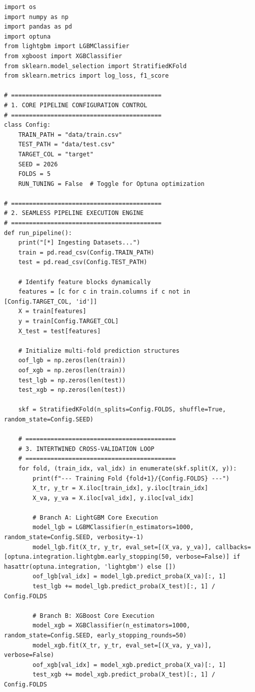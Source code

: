 \documentclass{article}
\begin{document}
\begin{verbatim}
import os
import numpy as np
import pandas as pd
import optuna
from lightgbm import LGBMClassifier
from xgboost import XGBClassifier
from sklearn.model_selection import StratifiedKFold
from sklearn.metrics import log_loss, f1_score

# ==========================================
# 1. CORE PIPELINE CONFIGURATION CONTROL
# ==========================================
class Config:
    TRAIN_PATH = "data/train.csv"
    TEST_PATH = "data/test.csv"
    TARGET_COL = "target"
    SEED = 2026
    FOLDS = 5
    RUN_TUNING = False  # Toggle for Optuna optimization

# ==========================================
# 2. SEAMLESS PIPELINE EXECUTION ENGINE
# ==========================================
def run_pipeline():
    print("[*] Ingesting Datasets...")
    train = pd.read_csv(Config.TRAIN_PATH)
    test = pd.read_csv(Config.TEST_PATH)

    # Identify feature blocks dynamically
    features = [c for c in train.columns if c not in [Config.TARGET_COL, 'id']]
    X = train[features]
    y = train[Config.TARGET_COL]
    X_test = test[features]

    # Initialize multi-fold prediction structures
    oof_lgb = np.zeros(len(train))
    oof_xgb = np.zeros(len(train))
    test_lgb = np.zeros(len(test))
    test_xgb = np.zeros(len(test))

    skf = StratifiedKFold(n_splits=Config.FOLDS, shuffle=True, random_state=Config.SEED)

    # ==========================================
    # 3. INTERTWINED CROSS-VALIDATION LOOP
    # ==========================================
    for fold, (train_idx, val_idx) in enumerate(skf.split(X, y)):
        print(f"--- Training Fold {fold+1}/{Config.FOLDS} ---")
        X_tr, y_tr = X.iloc[train_idx], y.iloc[train_idx]
        X_va, y_va = X.iloc[val_idx], y.iloc[val_idx]

        # Branch A: LightGBM Core Execution
        model_lgb = LGBMClassifier(n_estimators=1000, random_state=Config.SEED, verbosity=-1)
        model_lgb.fit(X_tr, y_tr, eval_set=[(X_va, y_va)], callbacks=[optuna.integration.lightgbm.early_stopping(50, verbose=False)] if hasattr(optuna.integration, 'lightgbm') else [])
        oof_lgb[val_idx] = model_lgb.predict_proba(X_va)[:, 1]
        test_lgb += model_lgb.predict_proba(X_test)[:, 1] / Config.FOLDS

        # Branch B: XGBoost Core Execution
        model_xgb = XGBClassifier(n_estimators=1000, random_state=Config.SEED, early_stopping_rounds=50)
        model_xgb.fit(X_tr, y_tr, eval_set=[(X_va, y_va)], verbose=False)
        oof_xgb[val_idx] = model_xgb.predict_proba(X_va)[:, 1]
        test_xgb += model_xgb.predict_proba(X_test)[:, 1] / Config.FOLDS


\end{verbatim}
\end{document}
